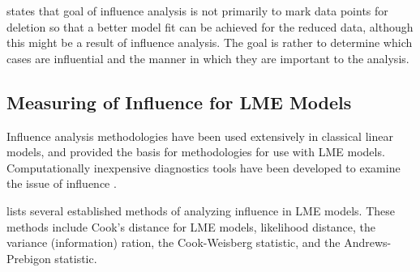 \documentclass[12pt, a4paper]{report}
\theoremstyle{definition}
\theoremstyle{remark}
\begin{document}


\citet{schabenberger} states that goal of influence analysis is not primarily to mark data points for deletion so that a better model fit can be achieved for the reduced data, although this might be a result of influence analysis. The goal is rather to determine which cases are influential and the manner in which they are important to the analysis. 




%



\subsection{Measuring of Influence for LME Models}
Influence analysis methodologies have been used extensively in classical linear models, and provided the basis for methodologies for use with LME models. Computationally inexpensive diagnostics tools have been developed to examine the issue of influence \citep{Zewotir}. 

\citet{Zewotir} lists several established methods of analyzing influence in LME models. These methods include Cook's distance for LME models,
 likelihood distance,
the variance (information) ration,
the  Cook-Weisberg statistic, and
the  Andrews-Prebigon statistic.
\end{document}
